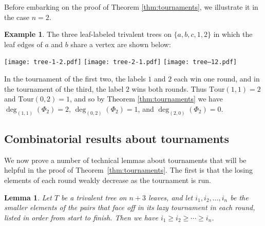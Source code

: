 \documentclass[11pt]{amsart}
\newcommand{\emb}{\Phi}
\newcommand{\Tour}{\mathrm{Tour}}
\newtheorem{lemma}[thm]{Lemma}
\numberwithin{thm}{section}
\numberwithin{equation}{section}
\numberwithin{figure}{section}
\theoremstyle{definition}
\newtheorem{example}[thm]{Example}
\begin{document}
Before embarking on the proof of Theorem \ref{thm:tournaments}, we illustrate it in the case $n=2$.

\begin{example}
 The three leaf-labeled trivalent trees on $\{a,b,c,1,2\}$ in which the leaf edges of $a$ and $b$ share a vertex are shown below:
 \begin{center}
 \texttt{[image: tree-1-2.pdf]}\hspace{2cm} \texttt{[image: tree-2-1.pdf]}\hspace{2cm} \texttt{[image: tree--12.pdf]}  
 \end{center}
 In the tournament of the first two, the labels $1$ and $2$ each win one round, and in the tournament of the third, the label $2$ wins both rounds.  Thus $\Tour(1,1)=2$ and $\Tour(0,2)=1$, and so by Theorem \ref{thm:tournaments} we have $\deg_{(1,1)}(\emb_2)=2$, $\deg_{(0,2)}(\emb_2)=1$, and $\deg_{(2,0)}(\emb_2)=0$.
\end{example}

\subsection{Combinatorial results about tournaments}

We now prove a number of technical lemmas about tournaments that will be helpful in the proof of Theorem~\ref{thm:tournaments}.  The first is that the losing elements of each round weakly decrease as the tournament is run.

\begin{lemma}\label{lem:losers-decrease}
  Let $T$ be a trivalent tree on $n+3$ leaves, and let $i_1,i_2,\ldots,i_n$ be the smaller elements of the pairs that face off in its lazy tournament in each round, listed in order from start to finish. Then we have $i_1\ge i_2 \ge \cdots \ge i_n$.
\end{lemma}
\end{document}
